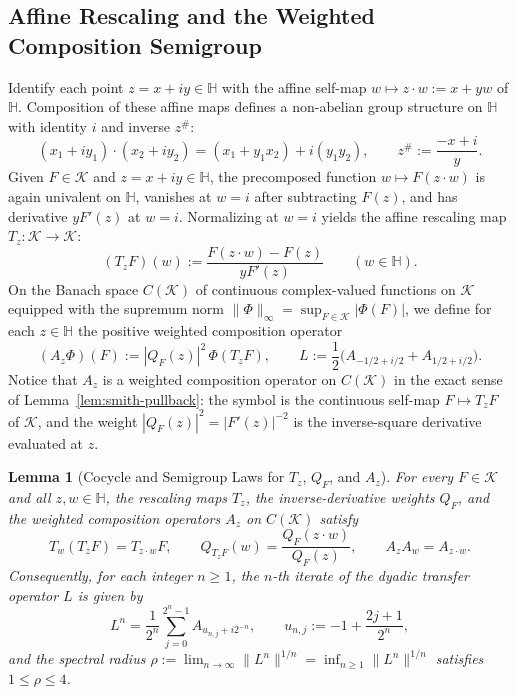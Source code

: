 \documentclass[12pt]{article}
\def\H{\mathbb{H}}
\def\K{\mathcal{K}}
\newtheorem{lemma}[thm]{Lemma}
\theoremstyle{definition}
\numberwithin{equation}{section}
\begin{document}
\subsection{Affine Rescaling and the Weighted Composition Semigroup}

Identify each point $z = x+iy \in \H$ with the affine self-map $w \mapsto z \cdot w := x + yw$ of $\H$. Composition of these affine maps defines a non-abelian group structure on $\H$ with identity $i$ and inverse $z^\#$:
\begin{equation}\label{eq:affine-group}
  (x_1 + i y_1) \cdot (x_2 + i y_2) = (x_1 + y_1 x_2) + i (y_1 y_2), \qquad z^\# := \frac{-x + i}{y}.
\end{equation}
Given $F \in \K$ and $z = x+iy \in \H$, the precomposed function $w \mapsto F(z \cdot w)$ is again univalent on $\H$, vanishes at $w = i$ after subtracting $F(z)$, and has derivative $y F'(z)$ at $w = i$. Normalizing at $w = i$ yields the affine rescaling map $T_z : \K \to \K$:
\begin{equation}\label{eq:Tz-def}
  (T_z F)(w) := \frac{F(z \cdot w) - F(z)}{y F'(z)} \qquad (w \in \H).
\end{equation}
On the Banach space $C(\K)$ of continuous complex-valued functions on $\K$ equipped with the supremum norm $\|\Phi\|_\infty = \sup_{F \in \K} |\Phi(F)|$, we define for each $z \in \H$ the positive weighted composition operator
\begin{equation}\label{eq:Az-L-def}
  (A_z \Phi)(F) := |Q_F(z)|^2 \, \Phi(T_z F), \qquad L := \frac{1}{2}\Big(A_{-1/2 + i/2} + A_{1/2 + i/2}\Big).
\end{equation}
Notice that $A_z$ is a weighted composition operator on $C(\K)$ in the exact sense of Lemma~\ref{lem:smith-pullback}: the symbol is the continuous self-map $F \mapsto T_z F$ of $\K$, and the weight $|Q_F(z)|^2 = |F'(z)|^{-2}$ is the inverse-square derivative evaluated at $z$.

\begin{lemma}[Cocycle and Semigroup Laws for $T_z$, $Q_F$, and $A_z$]\label{lem:cocycle}
For every $F \in \K$ and all $z, w \in \H$, the rescaling maps $T_z$, the inverse-derivative weights $Q_F$, and the weighted composition operators $A_z$ on $C(\K)$ satisfy
\begin{equation}\label{eq:cocycle-relations}
  T_w(T_z F) = T_{z \cdot w} F, \qquad Q_{T_z F}(w) = \frac{Q_F(z \cdot w)}{Q_F(z)}, \qquad A_z A_w = A_{z \cdot w}.
\end{equation}
Consequently, for each integer $n \ge 1$, the $n$-th iterate of the dyadic transfer operator $L$ is given by
\begin{equation}\label{eq:Ln-formula}
  L^n = \frac{1}{2^n} \sum_{j=0}^{2^n - 1} A_{u_{n, j} + i 2^{-n}}, \qquad u_{n, j} := -1 + \frac{2j + 1}{2^n},
\end{equation}
and the spectral radius $\rho := \lim_{n \to \infty} \|L^n\|^{1/n} = \inf_{n \ge 1} \|L^n\|^{1/n}$ satisfies $1 \le \rho \le 4$.
\end{lemma}
\end{document}
